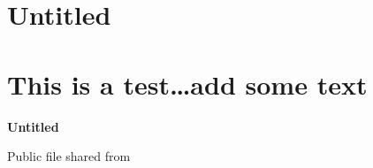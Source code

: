 \section{Untitled}\label{untitled}

\section{This is a test\ldots{}add some
text}\label{this-is-a-testadd-some-text}

\hypertarget{footer}{}
\hypertarget{title}{}
\textbf{Untitled}

\hypertarget{brand}{}
\protect\hypertarget{brandux5flabel}{}{ Public file shared from
\href{https://slack.com}{} }
